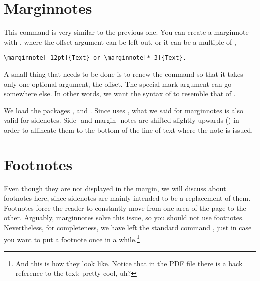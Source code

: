 \section{Marginnotes}

This command is very similar to the previous one. You can create a 
marginnote with , where the offset 
argument can be left out, or it can be a multiple of 
, 
\eg

\begin{lstlisting}[style=kaolstplain]
\marginnote[-12pt]{Text} or \marginnote[*-3]{Text}.
\end{lstlisting}

\begin{kaobox}[frametitle=To Do]
A small thing that needs to be done is to renew the  
command so that it takes only one optional argument, the offset. The 
special mark argument can go somewhere else. In other words, we want the 
syntax of  to resemble that of .
\end{kaobox}

We load the packages ,  and 
. Since  uses , 
what we said for marginnotes is also valid for sidenotes. Side- and 
margin- notes are shifted slightly upwards 
() in 
order to allineate them to the bottom of the line of text where the note 
is issued.

\section{Footnotes}

Even though they are not displayed in the margin, we will discuss about 
footnotes here, since sidenotes are mainly intended to be a replacement 
of them. Footnotes force the reader to constantly move from one area of 
the page to the other. Arguably, marginnotes solve this issue, so you 
should not use footnotes. Nevertheless, for completeness, we have left 
the standard command , just in case you want to put a 
footnote once in a while.\footnote{And this is how they look like. 
Notice that in the PDF file there is a back reference to the text; 
pretty cool, uh?}

